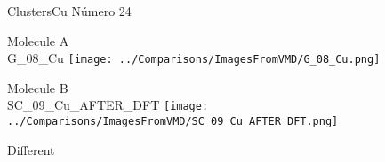 \vtab[-3cm]
\begin{center}
{\large ClustersCu \tab Número 24}
\end{center}
\begin{multicols}{2}
\begin{center}
Molecule A \\ 
G\_08\_Cu
\texttt{[image: ../Comparisons/ImagesFromVMD/G\_08\_Cu.png]}
\\
\vtab

\columnbreak
Molecule B \\ 
SC\_09\_Cu\_AFTER\_DFT
\texttt{[image: ../Comparisons/ImagesFromVMD/SC\_09\_Cu\_AFTER\_DFT.png]}
\\
\vtab


\end{center}
\end{multicols}
\begin{center}
\textcolor{NavyBlue}{\Large Different}
\end{center}

 \newpage

